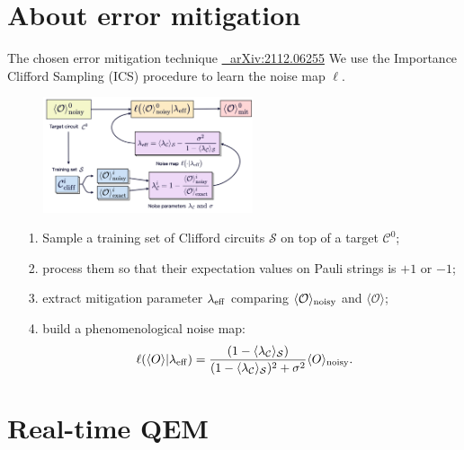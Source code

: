\documentclass[8pt, xcolor={svgnames}, hyperref={linkcolor=black}, aspectratio=169]{beamer}
\begin{document}
\section{About error mitigation}

\begin{frame}{The chosen error mitigation technique \hfill \href{https://arxiv.org/abs/2112.06255}{\faBook\,\, arXiv:2112.06255}}
We use the Importance Clifford Sampling (ICS) procedure to learn the noise map $\ell$.
\begin{figure}
    \includegraphics[width=0.55\textwidth]{figures/ics.png}
\end{figure}
\begin{itemize}[noitemsep]
\item[1.] Sample a training set of Clifford circuits $\mathcal{S}$ on top of a target $\mathcal{C}^0$;
\item[2.] process them so that their expectation values on Pauli strings is  $+1$ or $-1$;
\item[3.] extract mitigation parameter $\lambda_{\rm eff}$ comparing $\langle \mathcal{O}\rangle_{\rm noisy}$ and $\langle \mathcal{O}\rangle$;
\item[4.] build a phenomenological noise map:
$$ \ell(\langle O \rangle | \lambda_{\rm eff}) = \frac{(1 - \langle \lambda_{\mathcal{C}}
\rangle_{\mathcal{S}})}{(1 - \langle \lambda_{\mathcal{C}}\rangle_{\mathcal{S}})^2 
+ \sigma^2} \langle O \rangle_{\rm noisy}.$$
\end{itemize}
\end{frame}

\section{Real-time QEM}
\end{document}
